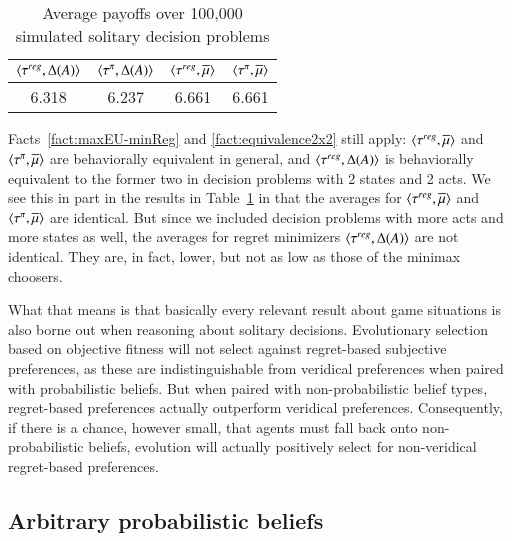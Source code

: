 \documentclass[fleqn,reqno,11pt]{article}
\begin{document}
\begin{table}
  \centering
  \begin{tabular}{cccc}
    \toprule
   $\left \langle \tau^{reg}, \Delta(A)\right\rangle$ 
 & $\left \langle \tau^{\pi}, \Delta(A)\right\rangle$ 
 & $\left \langle \tau^{reg}, \overline{\mu}\right\rangle$ 
 & $\left \langle \tau^{\pi}, \overline{\mu}\right\rangle$ 
 \\ \midrule
    6.318 & 6.237 & 6.661 & 6.661 \\ \bottomrule
  \end{tabular}
  \caption{Average payoffs over 100,000 simulated solitary decision problems}
  \label{tab:SolitaryDecisions}
\end{table}

Facts~\ref{fact:maxEU-minReg} and \ref{fact:equivalence2x2} still apply:
$\left \langle \tau^{reg}, \overline{\mu}\right\rangle$ and $\left \langle \tau^{\pi}, \overline{\mu}\right\rangle$ are behaviorally equivalent
in general, and $\left \langle \tau^{reg}, \Delta(A)\right\rangle$ is behaviorally equivalent to the former two in
decision problems with 2 states and 2 acts.  We see this in part in the
results in Table~\ref{tab:SolitaryDecisions} in that the averages for $\left \langle \tau^{reg},
  \overline{\mu}\right\rangle$ and $\left \langle \tau^{\pi}, \overline{\mu}\right\rangle$ are identical. But since we included decision
problems with more acts and more states as well, the averages for regret minimizers
$\left \langle \tau^{reg}, \Delta(A)\right\rangle$ are not identical. They are, in fact, lower, but not as low as
those of the minimax choosers. 

What that means is that basically every relevant result about game situations is also borne out
when reasoning about solitary decisions. Evolutionary selection based on objective fitness will
not select against regret-based subjective preferences, as these are indistinguishable from
veridical preferences when paired with probabilistic beliefs. But when paired with
non-probabilistic belief types, regret-based preferences actually outperform veridical
preferences. Consequently, if there is a chance, however small, that agents must fall back onto
non-probabilistic beliefs, evolution will actually positively select for non-veridical
regret-based preferences.

\subsection{Arbitrary probabilistic beliefs}
\label{sec:arbitr-prob-beli}
\end{document}
